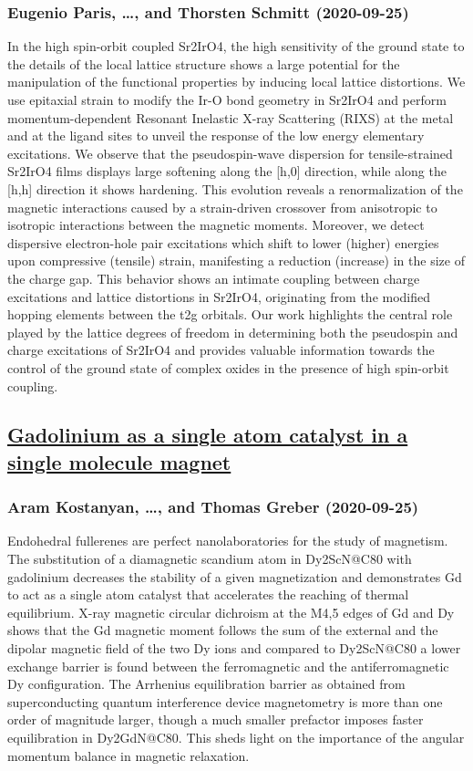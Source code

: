 \subsubsection*{Eugenio Paris, \dots, and Thorsten Schmitt (2020-09-25)}
In the high spin-orbit coupled Sr2IrO4, the high sensitivity of the ground
state to the details of the local lattice structure shows a large potential for
the manipulation of the functional properties by inducing local lattice
distortions. We use epitaxial strain to modify the Ir-O bond geometry in
Sr2IrO4 and perform momentum-dependent Resonant Inelastic X-ray Scattering
(RIXS) at the metal and at the ligand sites to unveil the response of the low
energy elementary excitations. We observe that the pseudospin-wave dispersion
for tensile-strained Sr2IrO4 films displays large softening along the [h,0]
direction, while along the [h,h] direction it shows hardening. This evolution
reveals a renormalization of the magnetic interactions caused by a
strain-driven crossover from anisotropic to isotropic interactions between the
magnetic moments. Moreover, we detect dispersive electron-hole pair excitations
which shift to lower (higher) energies upon compressive (tensile) strain,
manifesting a reduction (increase) in the size of the charge gap. This behavior
shows an intimate coupling between charge excitations and lattice distortions
in Sr2IrO4, originating from the modified hopping elements between the t2g
orbitals. Our work highlights the central role played by the lattice degrees of
freedom in determining both the pseudospin and charge excitations of Sr2IrO4
and provides valuable information towards the control of the ground state of
complex oxides in the presence of high spin-orbit coupling.

\subsection*{\href{http://arxiv.org/abs/2009.12259v1}{Gadolinium as a single atom catalyst in a single molecule magnet}}
\subsubsection*{Aram Kostanyan, \dots, and Thomas Greber (2020-09-25)}
Endohedral fullerenes are perfect nanolaboratories for the study of
magnetism. The substitution of a diamagnetic scandium atom in Dy2ScN@C80 with
gadolinium decreases the stability of a given magnetization and demonstrates Gd
to act as a single atom catalyst that accelerates the reaching of thermal
equilibrium. X-ray magnetic circular dichroism at the M4,5 edges of Gd and Dy
shows that the Gd magnetic moment follows the sum of the external and the
dipolar magnetic field of the two Dy ions and compared to Dy2ScN@C80 a lower
exchange barrier is found between the ferromagnetic and the antiferromagnetic
Dy configuration. The Arrhenius equilibration barrier as obtained from
superconducting quantum interference device magnetometry is more than one order
of magnitude larger, though a much smaller prefactor imposes faster
equilibration in Dy2GdN@C80. This sheds light on the importance of the angular
momentum balance in magnetic relaxation.

